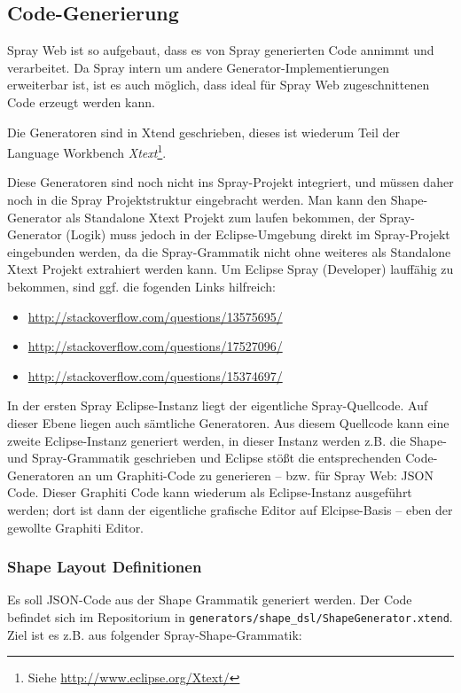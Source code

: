 \subsection{Code-Generierung}

Spray Web ist so aufgebaut, dass es von Spray generierten Code annimmt
und verarbeitet. Da Spray intern um andere Generator-Implementierungen
erweiterbar ist, ist es auch möglich, dass ideal für Spray Web
zugeschnittenen Code erzeugt werden kann.

Die Generatoren sind in Xtend geschrieben, dieses ist wiederum Teil
der Language Workbench
\emph{Xtext}\footnote{Siehe \url{http://www.eclipse.org/Xtext/}}.

Diese Generatoren sind noch nicht ins Spray-Projekt integriert, und müssen
daher noch in die Spray Projektstruktur eingebracht werden.
Man kann den Shape-Generator als Standalone Xtext Projekt zum laufen bekommen,
der Spray-Generator (Logik) muss jedoch in der Eclipse-Umgebung direkt
im Spray-Projekt eingebunden werden, da die Spray-Grammatik nicht ohne
weiteres als Standalone Xtext Projekt extrahiert werden kann.
Um Eclipse Spray (Developer) lauffähig zu bekommen, sind ggf. die fogenden
Links hilfreich:

\begin{itemize}
  \item \url{http://stackoverflow.com/questions/13575695/}
  \item \url{http://stackoverflow.com/questions/17527096/}
  \item \url{http://stackoverflow.com/questions/15374697/}
\end{itemize}

\noindent In der ersten Spray Eclipse-Instanz liegt der eigentliche
Spray-Quellcode. Auf dieser Ebene liegen auch sämtliche Generatoren.
Aus diesem Quellcode kann eine zweite Eclipse-Instanz generiert werden,
in dieser Instanz werden z.B. die Shape- und Spray-Grammatik geschrieben
und Eclipse stößt die entsprechenden Code-Generatoren an um Graphiti-Code
zu generieren -- bzw. für Spray Web: JSON Code.
Dieser Graphiti Code kann wiederum als Eclipse-Instanz ausgeführt werden;
dort ist dann der eigentliche grafische Editor auf Elcipse-Basis -- eben
der gewollte Graphiti Editor.

\subsubsection{Shape Layout Definitionen}

Es soll JSON-Code aus der Shape Grammatik \citep[gemäß][]{sprayUser}
generiert werden. Der Code befindet sich im Repositorium in
{\tt generators/shape\_dsl/ShapeGenerator.xtend}.
Ziel ist es z.B. aus folgender Spray-Shape-Grammatik:

